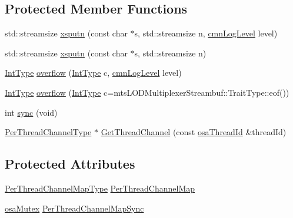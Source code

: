 \subsection*{Protected Member Functions}
\begin{DoxyCompactItemize}
\item 
std\-::streamsize \hyperlink{classmts_l_o_d_multiplexer_streambuf_acb1efb148cf0c6b3f491334900a10ff6}{xsputn} (const char $\ast$s, std\-::streamsize n, \hyperlink{cmn_log_lo_d_8h_a70c67165c37a0971e0dd1a85d4edaaae}{cmn\-Log\-Level} level)
\item 
std\-::streamsize \hyperlink{classmts_l_o_d_multiplexer_streambuf_aed21202f0ac5d81069e981ba1c8c2456}{xsputn} (const char $\ast$s, std\-::streamsize n)
\item 
\hyperlink{classmts_l_o_d_multiplexer_streambuf_a21823525be07ef7a8c1c3b053f3fedf2}{Int\-Type} \hyperlink{classmts_l_o_d_multiplexer_streambuf_a28d2e71bb95fadc157b7debc88f039a9}{overflow} (\hyperlink{classmts_l_o_d_multiplexer_streambuf_a21823525be07ef7a8c1c3b053f3fedf2}{Int\-Type} c, \hyperlink{cmn_log_lo_d_8h_a70c67165c37a0971e0dd1a85d4edaaae}{cmn\-Log\-Level} level)
\item 
\hyperlink{classmts_l_o_d_multiplexer_streambuf_a21823525be07ef7a8c1c3b053f3fedf2}{Int\-Type} \hyperlink{classmts_l_o_d_multiplexer_streambuf_a511a51ffb7c773e0de10d852e00ddeff}{overflow} (\hyperlink{classmts_l_o_d_multiplexer_streambuf_a21823525be07ef7a8c1c3b053f3fedf2}{Int\-Type} c=mts\-L\-O\-D\-Multiplexer\-Streambuf\-::\-Trait\-Type\-::eof())
\item 
int \hyperlink{classmts_l_o_d_multiplexer_streambuf_ab41fabcf881375e67f739986cd83f71d}{sync} (void)
\item 
\hyperlink{classmts_l_o_d_multiplexer_streambuf_a945f4bdc4f4a79290018377ae3de68e9}{Per\-Thread\-Channel\-Type} $\ast$ \hyperlink{classmts_l_o_d_multiplexer_streambuf_ac2a1f3cc381c102700cd148d482b0342}{Get\-Thread\-Channel} (const \hyperlink{classosa_thread_id}{osa\-Thread\-Id} \&thread\-Id)
\end{DoxyCompactItemize}
\subsection*{Protected Attributes}
\begin{DoxyCompactItemize}
\item 
\hyperlink{classmts_l_o_d_multiplexer_streambuf_aff1696a1ada12cd77decfe1deb5d8a63}{Per\-Thread\-Channel\-Map\-Type} \hyperlink{classmts_l_o_d_multiplexer_streambuf_af30117fcef2a05140848f7ca2678d87b}{Per\-Thread\-Channel\-Map}
\item 
\hyperlink{classosa_mutex}{osa\-Mutex} \hyperlink{classmts_l_o_d_multiplexer_streambuf_a9a3e813b12e3041f208b89134af18cd5}{Per\-Thread\-Channel\-Map\-Sync}
\end{DoxyCompactItemize}


